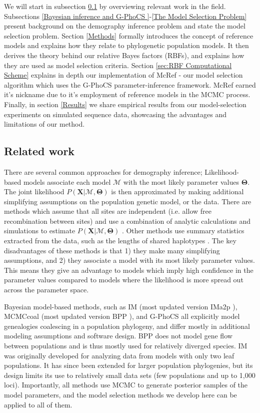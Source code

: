 \documentclass[11pt]{article}
\newcommand{\vect}[1]{\boldsymbol{\mathbf{#1}}}
\newcommand{\X}{\vect{X}}
\newcommand{\M}{\mathcal{M}}
\newcommand{\T}{\vect{\Theta}}
\newcommand{\1}{\mathbbm{1}}
\newcommand{\gp}{G-PhoCS }
\begin{document}
We will start in subsection \ref{Related work} by overviewing relevant work in the field.
%
Subsections \ref{Bayesian inference and \gp}-\ref{The Model Selection Problem} present background on the demography inference problem and state the model selection problem.
%
Section \ref{Methods} formally introduces the concept of reference models and explains how they relate to phylogenetic population models. It then derives the theory behind our relative Bayes factors (RBFs), and explains how they are used as model selection criteria. 
%
Section \ref{sec:RBF Computational Scheme} explains in depth our implementation of McRef - our model selection algorithm which uses the \gp parameter-inference framework. McRef earned it's nickname due to it's employment of reference models in the MCMC process.
%
Finally, in section \ref{Results} we share empirical results from our model-selection experiments on simulated sequence data, showcasing the advantages and limitations of our method.


\subsection{Related work} \label{Related work}

There are several common approaches for demography inference;
%
Likelihood-based models associate each model $\M$ with the most likely parameter values $\T$.
%
The joint likelihood $P(\X|\M,\T)$ is then approximated by making additional simplifying assumptions on the population genetic model, or the data.
%
There are methods which assume that all sites are independent (i.e. allow free recombination between sites) and use a combination of analytic calculations and simulations to estimate $P(\X|\M,\T)$ \citep{GUTEETAL09,KAMMETAL17,KAMMETAL18}. 
%
Other methods use summary statistics extracted from the data, such as the lengths of shared haplotypes \citep{HARRNIEL13,BROWBROW15}. 
%
The key disadvantages of these methods is that 1) they make many simplifying assumptions, and 2) they associate a model with its most likely parameter values. 
%
This means they give an advantage to models which imply high confidence in the parameter values compared to models where the likelihood is more spread out across the parameter space.

Bayesian model-based methods, such as IM \citep{NIELWAKE01} (most updated version IMa2p \citep{HEYNIEL07,SETHHEY16}), MCMCcoal \cite{RANNYANG03} (most updated version BPP \citep{YANG15}), and \gp \citep{GRONETAL11} all explicitly model genealogies coalescing in a population phylogeny, and differ mostly in additional modeling assumptions and software design.
%
BPP does not model gene flow between populations and is thus mostly used for relatively diverged species. 
%
IM was originally developed for analyzing data from models with only two leaf populations. 
%
It has since been extended for larger population phylogenies, but its design limits its use to relatively small data sets (few populations and up to 1,000 loci). 
%
Importantly, all methods use MCMC to generate posterior samples of the model parameters, and the model selection methods we develop here can be applied to all of them.
\end{document}
